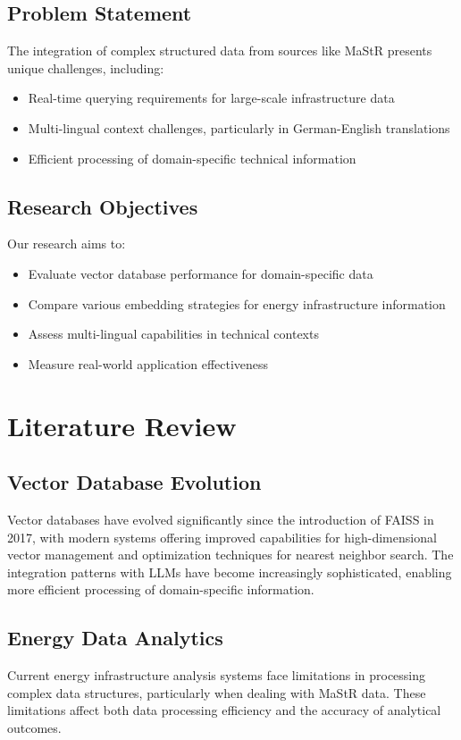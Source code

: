 \documentclass[conference]{IEEEtran}
\begin{document}
\subsection{Problem Statement}
The integration of complex structured data from sources like MaStR presents unique challenges, including:
\begin{itemize}
\item Real-time querying requirements for large-scale infrastructure data
\item Multi-lingual context challenges, particularly in German-English translations
\item Efficient processing of domain-specific technical information
\end{itemize}

\subsection{Research Objectives}
Our research aims to:
\begin{itemize}
\item Evaluate vector database performance for domain-specific data
\item Compare various embedding strategies for energy infrastructure information
\item Assess multi-lingual capabilities in technical contexts
\item Measure real-world application effectiveness
\end{itemize}

\section{Literature Review}
\subsection{Vector Database Evolution}
Vector databases have evolved significantly since the introduction of FAISS in 2017, with modern systems offering improved capabilities for high-dimensional vector management and optimization techniques for nearest neighbor search. The integration patterns with LLMs have become increasingly sophisticated, enabling more efficient processing of domain-specific information.

\subsection{Energy Data Analytics}
Current energy infrastructure analysis systems face limitations in processing complex data structures, particularly when dealing with MaStR data. These limitations affect both data processing efficiency and the accuracy of analytical outcomes.
\end{document}
